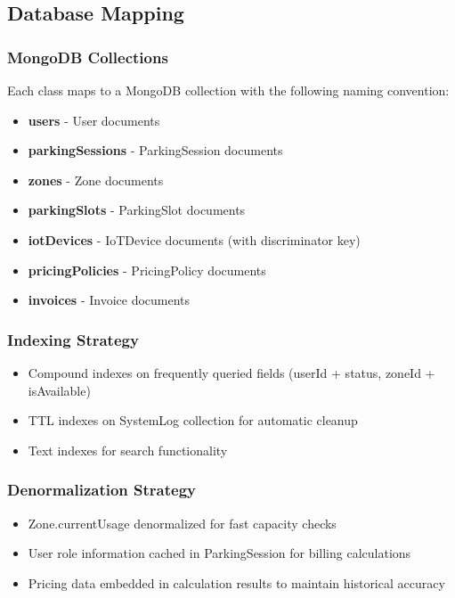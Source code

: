 \subsection{Database Mapping}

\subsubsection{MongoDB Collections}
Each class maps to a MongoDB collection with the following naming convention:
\begin{itemize}
\item \textbf{users} - User documents
\item \textbf{parkingSessions} - ParkingSession documents
\item \textbf{zones} - Zone documents
\item \textbf{parkingSlots} - ParkingSlot documents
\item \textbf{iotDevices} - IoTDevice documents (with discriminator key)
\item \textbf{pricingPolicies} - PricingPolicy documents
\item \textbf{invoices} - Invoice documents
\end{itemize}

\subsubsection{Indexing Strategy}
\begin{itemize}
\item Compound indexes on frequently queried fields (userId + status, zoneId + isAvailable)
\item TTL indexes on SystemLog collection for automatic cleanup
\item Text indexes for search functionality
\end{itemize}

\subsubsection{Denormalization Strategy}
\begin{itemize}
\item Zone.currentUsage denormalized for fast capacity checks
\item User role information cached in ParkingSession for billing calculations
\item Pricing data embedded in calculation results to maintain historical accuracy
\end{itemize}